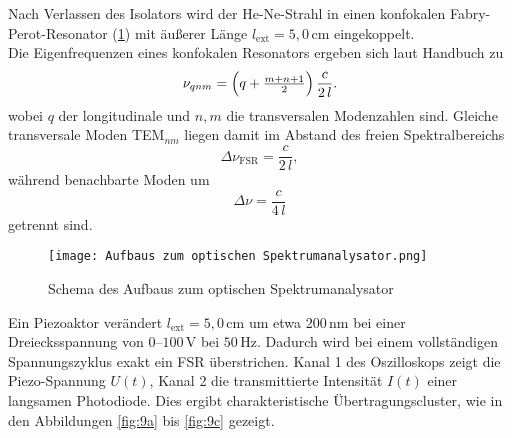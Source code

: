 Nach Verlassen des Isolators wird der He-Ne-Strahl in einen konfokalen Fabry-Perot-Resonator (\cref{fig:Spektrumanalysator}) mit äußerer Länge $l_{\mathrm{ext}} = 5{,}0\,\si{\centi\meter}$ eingekoppelt. \\
Die Eigenfrequenzen eines konfokalen Resonators ergeben sich laut Handbuch \cite{praktikum} zu
\begin{equation}
  \nu_{qnm}
  = \Bigl(q + \tfrac{m+n+1}{2}\Bigr)\,\frac{c}{2\,l} .
\end{equation}
wobei \( q \) der longitudinale und \( n, m \) die transversalen Modenzahlen sind. 
Gleiche transversale Moden TEM$_{nm}$ liegen damit im Abstand des freien Spektralbereichs \cite{praktikum}
\begin{equation*}
  \Delta\nu_{\mathrm{FSR}}
  = \frac{c}{2\,l},
\end{equation*}
während benachbarte Moden um
\begin{equation*}
  \Delta\nu
  = \frac{c}{4\,l}
\end{equation*}
getrennt sind.
\begin{figure}[htbp]
  \centering
  \texttt{[image: Aufbaus zum optischen Spektrumanalysator.png]}
  \caption{Schema des Aufbaus zum optischen Spektrumanalysator \cite{praktikum}}
  \label{fig:Spektrumanalysator}
\end{figure}
Ein Piezoaktor verändert \( l_{\mathrm{ext}} = 5{,}0\,\si{\centi\meter} \) um etwa \(200\,\si{\nano\meter}\) bei einer Dreiecksspannung von $0$–$100\,\si{\volt}$ bei $50\,\si{\hertz}$. 
Dadurch wird bei einem vollständigen Spannungszyklus exakt ein FSR überstrichen. 
Kanal 1 des Oszilloskops zeigt die Piezo-Spannung \( U(t) \), Kanal 2 die transmittierte Intensität \( I(t) \) einer langsamen Photodiode. 
Dies ergibt charakteristische Übertragungscluster, wie in den Abbildungen \cref{fig:9a} bis \cref{fig:9c} gezeigt.

